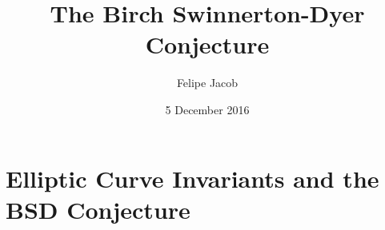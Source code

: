 \documentclass[12pt, a4paper]{amsart}
\begin{document}

\theoremstyle{plain}
\newtheorem{prop}{Proposition}[subsection]
\newtheorem{thm}[prop]{Theorem}
\newtheorem{cor}[prop]{Corollary}
\newtheorem{lemma}[prop]{Lemma}
\newtheorem{conj}[prop]{Conjecture}

\theoremstyle{definition}
\newtheorem{example}[prop]{Example}
\newtheorem{defn}[prop]{Definition}

\theoremstyle{remark}
\newtheorem{remark}[prop]{Remark}


\newcommand{\defin}{\textbf}
\newcommand{\CC}{{\mathbb C}}
\newcommand{\cov}{{\operatorname{cov}}}
\newcommand{\eE}{{\mathcal E}}
\newcommand{\NN}{{\mathbb N}}
\newcommand{\PP}{{\mathbb P}}
\newcommand{\ZZ}{{\mathbb Z}}
\renewcommand{\SS}{{\mathbb S}}
\newcommand{\DD}{{\mathbb D}}
\newcommand{\RR}{{\mathbb R}}
\newcommand{\QQ}{{\mathbb Q}}
\newcommand{\rR}{{\mathcal R}}
\newcommand{\OO}{{\mathcal O}}
\newcommand{\p}{\partial}
\newcommand{\mM}{{\mathcal M}}
\newcommand{\pP}{{\mathcal P}}
\newcommand{\iI}{{\mathcal I}}
\newcommand{\jJ}{{\mathcal J}}
\newcommand{\uU}{{\mathcal U}}
\newcommand{\sS}{{\mathfrak S}}
\newcommand{\1}{{\mathds 1}}
\newcommand{\Crit}{\operatorname{Crit}}
\newcommand{\GKK}{{G_{\bar{K} : K}}}
\newcommand{\st}{{\text{s.t.}}}
\newcommand{\ra}{\rightarrow}
\newcommand{\Sel}{\text{Sel}}
\newcommand{\Sha}{\text{Sha}}
\newcommand{\TS}{\text{TS}}
\newcommand{\Eb}{\bar{E}}
\newcommand{\EQ}{E(\QQ)}
\newcommand{\cmark}{\ding{51}}
\newcommand{\xmark}{\ding{55}}
\newcommand{\EFp}{{\tilde{E}(\FF_p)}}
\newcommand{\EFt}{{\tilde{E}(\FF_2)}}
\newcommand{\EQp}{{E(\QQ_p)}}
\newcommand{\FF}{\mathbb{F}}
\newcommand{\HH}{\mathbb{H}}
\newcommand{\Tors}{{\text{Tors}}}

\newcommand{\red}[1]{{\color{red}#1}}

\title{
  {The Birch Swinnerton-Dyer Conjecture}\\
}
\author{Felipe Jacob}
\date{5 December 2016}

\tableofcontents
\pagebreak

\maketitle

\section{Elliptic Curve Invariants and the BSD Conjecture}
\end{document}
